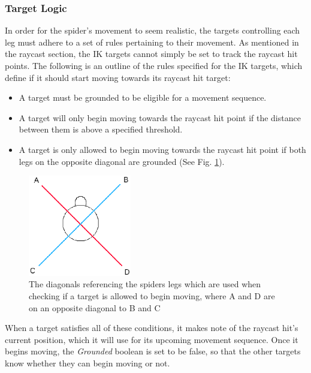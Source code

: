 \subsubsection{Target Logic}
In order for the spider's movement to seem realistic, the targets controlling
each leg must adhere to a set of rules pertaining to their movement. As
mentioned in the raycast section, the IK targets cannot simply be set to track
the raycast hit points. The following is an outline of the rules specified for
the IK targets, which define if it should start moving towards its raycast hit
target:
\begin{itemize}
    \item A target must be grounded to be eligible for a movement sequence.

    \item A target will only begin moving towards the raycast hit point if the
        distance between them is above a specified threshold.

    \item A target is only allowed to begin moving towards the raycast hit
        point if both legs on the opposite diagonal are grounded (See Fig.
        \ref{fig:diagonals}).
\end{itemize}


\begin{figure}
    \centering
    \captionsetup{justification=centering}
    \includegraphics[width=0.4\textwidth]{grafika/diagonals2.eps}
    \caption{The diagonals referencing the spiders legs which are used when
    checking if a target is allowed to begin moving, where A and D are on an
opposite diagonal to B and C}
    \label{fig:diagonals}
\end{figure}

When a target satisfies all of these conditions, it makes note of the raycast
hit's current position, which it will use for its upcoming movement sequence.
Once it begins moving, the \textit{Grounded} boolean is set to be false, so that
the other targets know whether they can begin moving or not.

